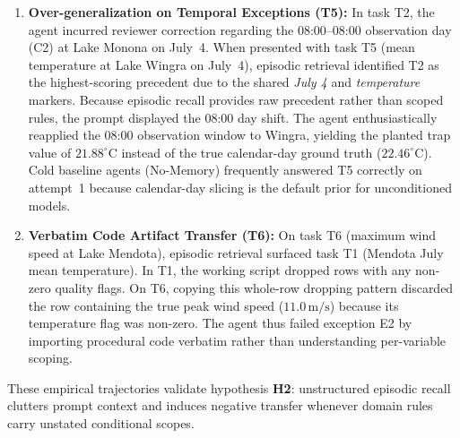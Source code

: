 \begin{enumerate}
    \item \textbf{Over-generalization on Temporal Exceptions (T5):}
    In task T2, the agent incurred reviewer correction regarding the 08:00--08:00 observation day (C2) at Lake Monona on July~4. When presented with task T5 (mean temperature at Lake Wingra on July~4), episodic retrieval identified T2 as the highest-scoring precedent due to the shared \textit{July 4} and \textit{temperature} markers. Because episodic recall provides raw precedent rather than scoped rules, the prompt displayed the 08:00 day shift. The agent enthusiastically reapplied the 08:00 observation window to Wingra, yielding the planted trap value of $21.88^\circ\text{C}$ instead of the true calendar-day ground truth ($22.46^\circ\text{C}$). Cold baseline agents (No-Memory) frequently answered T5 correctly on attempt~1 because calendar-day slicing is the default prior for unconditioned models.

    \item \textbf{Verbatim Code Artifact Transfer (T6):}
    On task T6 (maximum wind speed at Lake Mendota), episodic retrieval surfaced task T1 (Mendota July mean temperature). In T1, the working script dropped rows with any non-zero quality flags. On T6, copying this whole-row dropping pattern discarded the row containing the true peak wind speed ($11.0\,\text{m/s}$) because its temperature flag was non-zero. The agent thus failed exception E2 by importing procedural code verbatim rather than understanding per-variable scoping.
\end{enumerate}

These empirical trajectories validate hypothesis \textbf{H2}: unstructured episodic recall clutters prompt context and induces negative transfer whenever domain rules carry unstated conditional scopes.
